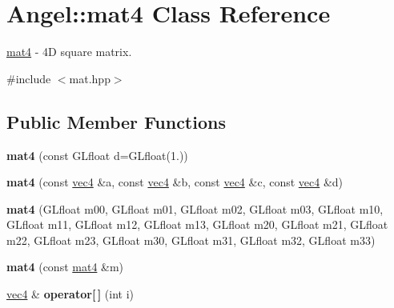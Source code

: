 \hypertarget{class_angel_1_1mat4}{\section{Angel\-:\-:mat4 Class Reference}
\label{class_angel_1_1mat4}
}


\hyperlink{class_angel_1_1mat4}{mat4} -\/ 4\-D square matrix.  




{\ttfamily \#include $<$mat.\-hpp$>$}

\subsection*{Public Member Functions}
\begin{DoxyCompactItemize}
\item 
\hypertarget{class_angel_1_1mat4_ae4dcc751dab1439d187d31187527d7db}{{\bfseries mat4} (const G\-Lfloat d=G\-Lfloat(1.))}\label{class_angel_1_1mat4_ae4dcc751dab1439d187d31187527d7db}

\item 
\hypertarget{class_angel_1_1mat4_a751177e4ed4083c4935c18e20d99c394}{{\bfseries mat4} (const \hyperlink{struct_angel_1_1vec4}{vec4} \&a, const \hyperlink{struct_angel_1_1vec4}{vec4} \&b, const \hyperlink{struct_angel_1_1vec4}{vec4} \&c, const \hyperlink{struct_angel_1_1vec4}{vec4} \&d)}\label{class_angel_1_1mat4_a751177e4ed4083c4935c18e20d99c394}

\item 
\hypertarget{class_angel_1_1mat4_a4231505378561a211c9c98ef665ed2e4}{{\bfseries mat4} (G\-Lfloat m00, G\-Lfloat m01, G\-Lfloat m02, G\-Lfloat m03, G\-Lfloat m10, G\-Lfloat m11, G\-Lfloat m12, G\-Lfloat m13, G\-Lfloat m20, G\-Lfloat m21, G\-Lfloat m22, G\-Lfloat m23, G\-Lfloat m30, G\-Lfloat m31, G\-Lfloat m32, G\-Lfloat m33)}\label{class_angel_1_1mat4_a4231505378561a211c9c98ef665ed2e4}

\item 
\hypertarget{class_angel_1_1mat4_aa1d00cd134d37716c9613435b624bf7d}{{\bfseries mat4} (const \hyperlink{class_angel_1_1mat4}{mat4} \&m)}\label{class_angel_1_1mat4_aa1d00cd134d37716c9613435b624bf7d}

\item 
\hypertarget{class_angel_1_1mat4_ac78d6efb4a0d639d645acd4f00e8b3b6}{\hyperlink{struct_angel_1_1vec4}{vec4} \& {\bfseries operator\mbox{[}$\,$\mbox{]}} (int i)}\label{class_angel_1_1mat4_ac78d6efb4a0d639d645acd4f00e8b3b6}


\end{DoxyCompactItemize}
